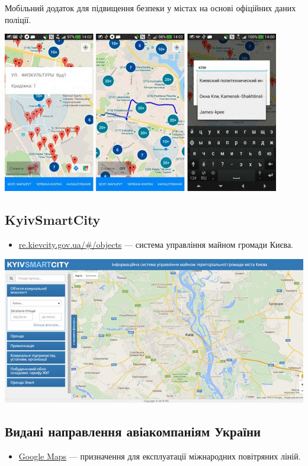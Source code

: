 Мобільний додаток для підвищення безпеки у містах на основі офіційних даних поліції.

\includegraphics{images/027.jpg}

\subsection{KyivSmartCity}

\begin{itemize}
    \item \href{http://re.kievcity.gov.ua/#/objects}{re.kievcity.gov.ua/#/objects} — система управління майном громади Києва.
\end{itemize}

\includegraphics{images/028.jpg}

\subsection{Видані направлення авіакомпаніям України}

\begin{itemize}
    \item \href{https://www.google.com/maps/d/viewer?mid=zQyzchol-IlQ.kqJvVjvXIY-s&hl=en_US}{Google Maps} — призначення для експлуатації міжнародних повітряних ліній.
\end{itemize}

